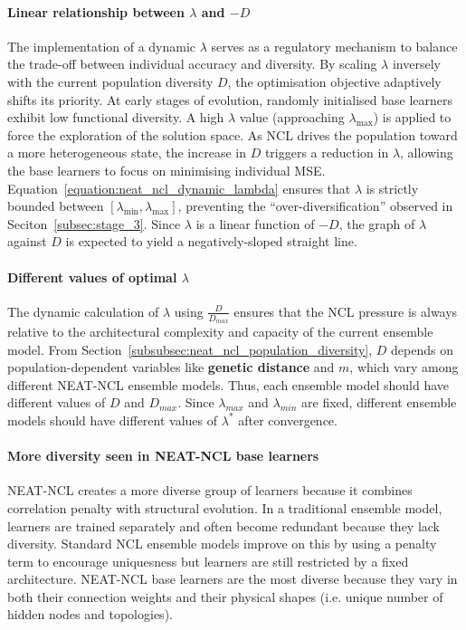 \paragraph{Linear relationship between $\lambda$ and $-D$}
The implementation of a dynamic $\lambda$ serves as a regulatory mechanism to balance the trade-off between individual accuracy and diversity. By scaling $\lambda$ inversely with the current population diversity $D$, the optimisation objective adaptively shifts its priority. At early stages of evolution, randomly initialised base learners exhibit low functional diversity. A high $\lambda$ value (approaching $\lambda_{\max}$) is applied to force the exploration of the solution space. As NCL drives the population toward a more heterogeneous state, the increase in $D$ triggers a reduction in $\lambda$, allowing the base learners to focus on minimising individual MSE. Equation~\ref{equation:neat_ncl_dynamic_lambda} ensures that $\lambda$ is strictly bounded between $[\lambda_{\min}, \lambda_{\max}]$, preventing the ``over-diversification'' observed in Seciton~\ref{subsec:stage_3}. Since $\lambda$ is a linear function of $-D$, the graph of $\lambda$ against $D$ is expected to yield a negatively-sloped straight line. 

\paragraph{Different values of optimal $\lambda$}
The dynamic calculation of $\lambda$ using $\frac{D}{D_{max}}$ ensures that the NCL pressure is always relative to the architectural complexity and capacity of the current ensemble model. From Section~\ref{subsubsec:neat_ncl_population_diversity}, $D$ depends on population-dependent variables like \textbf{genetic distance} and $m$, which vary among different NEAT-NCL ensemble models. Thus, each ensemble model should have different values of $D$ and $D_{max}$. Since $\lambda_{max}$ and $\lambda_{min}$ are fixed, different ensemble models should have different values of $\lambda^*$ after convergence. 

\paragraph{More diversity seen in NEAT-NCL base learners}
NEAT-NCL creates a more diverse group of learners because it combines correlation penalty with structural evolution. In a traditional ensemble model, learners are trained separately and often become redundant because they lack diversity. Standard NCL ensemble models improve on this by using a penalty term to encourage uniquesness but learners are still restricted by a fixed architecture. NEAT-NCL base learners are the most diverse because they vary in both their connection weights and their physical shapes (i.e. unique number of hidden nodes and topologies). 


